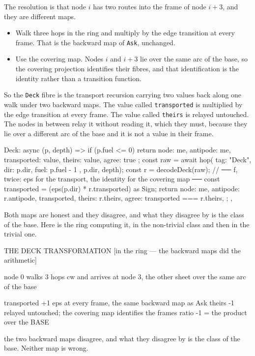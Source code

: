 \documentclass[11pt,a4paper]{article}
\begin{document}
The resolution is that node $i$ has two routes into the frame of node $i+3$, and they
are different maps.

\begin{itemize}
\item Walk three hops in the ring and multiply by the edge transition at every frame.
That is the backward map of \verb|Ask|, unchanged.
\item Use the covering map. Nodes $i$ and $i+3$ lie over the same arc of the base, so
the covering projection identifies their fibres, and that identification is the
identity rather than a transition function.
\end{itemize}

So the \verb|Deck| fibre is the transport recursion carrying two values back along one
walk under two backward maps. The value called \verb|transported| is multiplied by the
edge transition at every frame. The value called \verb|theirs| is relayed untouched.
The nodes in between relay it without reading it, which they must, because they lie
over a different arc of the base and it is not a value in their frame.

\begin{code}
Deck: async (p, depth) => {
    if (p.fuel <= 0) {
      return { node: me, antipode: me, transported: value, theirs: value, agree: true };
    }
    const raw = await hop({ tag: "Deck", dir: p.dir, fuel: p.fuel - 1 }, p.dir, depth);
    const r = decodeDeck(raw);
    // ── f, twice: eps for the transport, the identity for the covering map ──
    const transported = (eps(p.dir) * r.transported) as Sign;
    return {
      node: me,
      antipode: r.antipode,
      transported,
      theirs: r.theirs,
      agree: transported === r.theirs,
    };
  },
\end{code}

Both maps are honest and they disagree, and what they disagree by is the class of the
base. Here is the ring computing it, in the non-trivial class and then in the trivial
one.

\begin{term}
  THE DECK TRANSFORMATION   [in the ring — the backward maps did the arithmetic]

    node 0 walks 3 hops cw and arrives at node 3, the other
    sheet over the same arc of the base

    transported   +1   eps at every frame, the same backward map as Ask
    theirs        -1   relayed untouched; the covering map identifies the frames
    ratio         -1   = the product over the BASE

    the two backward maps disagree, and what they disagree by is the
    class of the base. Neither map is wrong.
\end{term}
\end{document}
